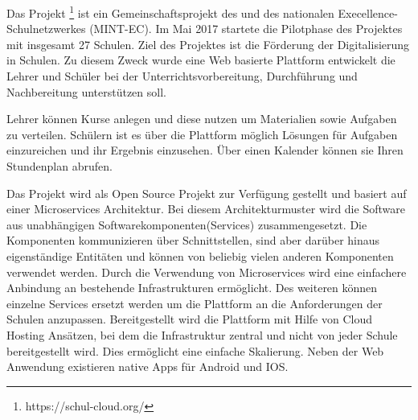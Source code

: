 Das Projekt \schulCloud\footnote{https://schul-cloud.org/} ist ein Gemeinschaftsprojekt des \hpi und des nationalen Execellence-Schulnetzwerkes (MINT-EC). Im Mai 2017 startete die Pilotphase des Projektes mit insgesamt 27 Schulen. Ziel des Projektes ist die Förderung der Digitalisierung in Schulen. 
Zu diesem Zweck wurde eine Web basierte Plattform entwickelt die Lehrer und Schüler bei der Unterrichtsvorbereitung, Durchführung und Nachbereitung unterstützen soll. 

Lehrer können Kurse anlegen und diese nutzen um Materialien sowie Aufgaben zu verteilen. Schülern ist es über die Plattform möglich Lösungen für Aufgaben einzureichen und ihr Ergebnis einzusehen. Über einen Kalender können sie Ihren Stundenplan abrufen.

Das Projekt wird als Open Source Projekt zur Verfügung gestellt und basiert auf einer Microservices Architektur. Bei diesem Architekturmuster wird die Software aus unabhängigen Softwarekomponenten(Services) zusammengesetzt. Die Komponenten kommunizieren über Schnittstellen, sind aber darüber hinaus eigenständige Entitäten und können von beliebig vielen anderen Komponenten verwendet werden. Durch die Verwendung von Microservices wird eine einfachere Anbindung an bestehende Infrastrukturen ermöglicht. Des weiteren können einzelne Services ersetzt werden um die Plattform an die Anforderungen der Schulen anzupassen. Bereitgestellt wird die Plattform mit Hilfe von Cloud Hosting Ansätzen, bei dem die Infrastruktur zentral und nicht von jeder Schule bereitgestellt wird. Dies ermöglicht eine einfache Skalierung. Neben der Web Anwendung existieren native Apps für Android und IOS.


%
%
%
%
%




